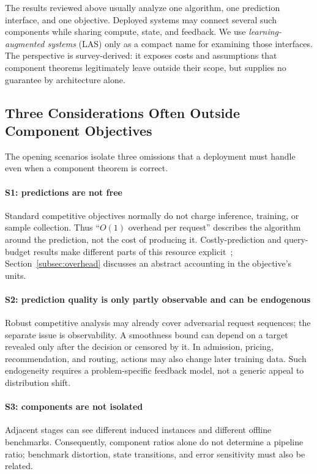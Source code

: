 \documentclass[acmsmall,screen,nonacm]{acmart}
\theoremstyle{acmdefinition}%
\begin{document}
The results reviewed above usually analyze one algorithm, one prediction interface, and one objective. Deployed systems may connect several such components while sharing compute, state, and feedback. We use \emph{learning-augmented systems} (LAS) only as a compact name for examining those interfaces. The perspective is survey-derived: it exposes costs and assumptions that component theorems legitimately leave outside their scope, but supplies no guarantee by architecture alone.

\subsection{Three Considerations Often Outside Component Objectives}
\label{subsec:broken}

The opening scenarios isolate three omissions that a deployment must handle even when a component theorem is correct.

\paragraph{S1: predictions are not free}
Standard competitive objectives normally do not charge inference, training, or sample collection. Thus ``$O(1)$ overhead per request'' describes the algorithm around the prediction, not the cost of producing it. Costly-prediction and query-budget results make different parts of this resource explicit~\cite{drygala2023costly,im2022parsimonious,sadek2024reduced}; Section~\ref{subsec:overhead} discusses an abstract accounting in the objective's units.

\paragraph{S2: prediction quality is only partly observable and can be endogenous}
Robust competitive analysis may already cover adversarial request sequences; the separate issue is observability. A smoothness bound can depend on a target revealed only after the decision or censored by it. In admission, pricing, recommendation, and routing, actions may also change later training data. Such endogeneity requires a problem-specific feedback model, not a generic appeal to distribution shift.

\paragraph{S3: components are not isolated}
Adjacent stages can see different induced instances and different offline benchmarks. Consequently, component ratios alone do not determine a pipeline ratio; benchmark distortion, state transitions, and error sensitivity must also be related.
\end{document}

